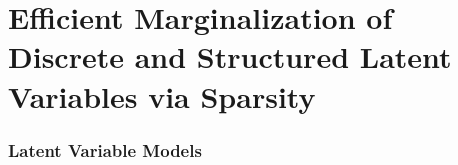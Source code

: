 \documentclass[xetex,aspectratio=169,xcolor,professionalfonts,hyperref]{beamer}
\begin{document}

\section{Efficient Marginalization of Discrete and Structured Latent Variables via Sparsity}

\begin{frame}
    \frametitle{Latent Variable Models}

    \begin{itemize}
    \end{itemize}
    

\end{frame}
\end{document}
